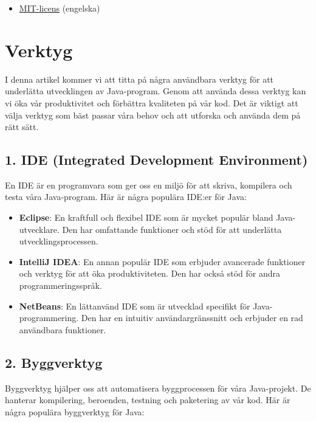\begin{itemize}
\tightlist
\item
  \href{https://opensource.org/licenses/MIT}{MIT-licens} (engelska)
\end{itemize}

\hypertarget{verktyg}{%
\section{Verktyg}\label{verktyg}}

I denna artikel kommer vi att titta på några användbara verktyg för att
underlätta utvecklingen av Java-program. Genom att använda dessa verktyg
kan vi öka vår produktivitet och förbättra kvaliteten på vår kod. Det är
viktigt att välja verktyg som bäst passar våra behov och att utforska
och använda dem på rätt sätt.

\hypertarget{ide-integrated-development-environment}{%
\subsection{1. IDE (Integrated Development
Environment)}\label{ide-integrated-development-environment}}

En IDE är en programvara som ger oss en miljö för att skriva, kompilera
och testa våra Java-program. Här är några populära IDE:er för Java:

\begin{itemize}
\tightlist
\item
  \textbf{Eclipse}: En kraftfull och flexibel IDE som är mycket populär
  bland Java-utvecklare. Den har omfattande funktioner och stöd för att
  underlätta utvecklingsprocessen.
\item
  \textbf{IntelliJ IDEA}: En annan populär IDE som erbjuder avancerade
  funktioner och verktyg för att öka produktiviteten. Den har också stöd
  för andra programmeringsspråk.
\item
  \textbf{NetBeans}: En lättanvänd IDE som är utvecklad specifikt för
  Java-programmering. Den har en intuitiv användargränssnitt och
  erbjuder en rad användbara funktioner.
\end{itemize}

\hypertarget{byggverktyg}{%
\subsection{2. Byggverktyg}\label{byggverktyg}}

Byggverktyg hjälper oss att automatisera byggprocessen för våra
Java-projekt. De hanterar kompilering, beroenden, testning och
paketering av vår kod. Här är några populära byggverktyg för Java:

